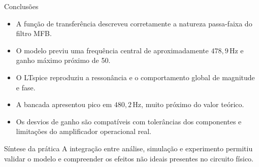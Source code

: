 \begin{frame}{Conclusões}
  \begin{itemize}
    \item A função de transferência descreveu corretamente a natureza passa-faixa do filtro MFB.
    \item O modelo previu uma frequência central de aproximadamente
      $478{,}9\,\mathrm{Hz}$ e ganho máximo próximo de 50.
    \item O LTspice reproduziu a ressonância e o comportamento global de magnitude e fase.
    \item A bancada apresentou pico em $480{,}2\,\mathrm{Hz}$, muito próximo do valor teórico.
    \item Os desvios de ganho são compatíveis com tolerâncias dos componentes e limitações do amplificador operacional real.
  \end{itemize}

  \begin{alertblock}{Síntese da prática}
    A integração entre análise, simulação e experimento permitiu validar o modelo e
    compreender os efeitos não ideais presentes no circuito físico.
  \end{alertblock}
\end{frame}